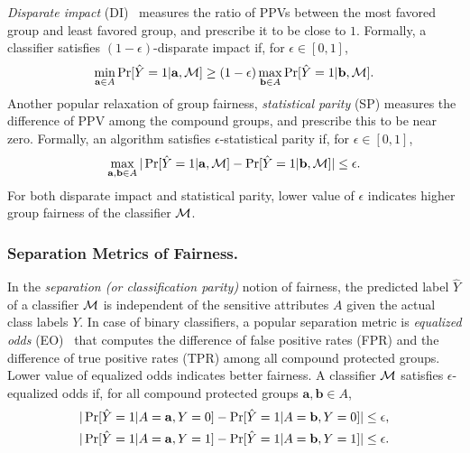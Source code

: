 \textit{Disparate impact} (DI)~\cite{feldman2015certifying} measures the ratio of PPVs between the most favored group and least favored group, and prescribe it to be close to $1$. Formally, a classifier satisfies $(1 - \epsilon)$-disparate impact if, for $\epsilon \in [0,1] $,
\[
	\min_{\mathbf{a} \in A} \Pr[\hat{Y} =1 | \mathbf{a}, \mathcal{M}]  \ge (1 - \epsilon) \max_{\mathbf{b} \in A} \Pr[\hat{Y} =1 | \mathbf{b}, \mathcal{M}].
\]
Another popular relaxation of group fairness, \textit{statistical parity} (SP) measures the difference of PPV among the compound groups, and prescribe this to be near zero. Formally, an algorithm satisfies $\epsilon$-statistical parity if, for $\epsilon \in [0,1] $, 
\[
\max_{\mathbf{a}, \mathbf{b} \in A}|\Pr[\hat{Y} =1 | \mathbf{a}, \mathcal{M}] - \Pr [\hat{Y} = 1| \mathbf{b}, \mathcal{M}]| \le \epsilon.
\]
For both disparate impact and statistical parity, lower value of $\epsilon$ indicates higher group fairness of the classifier $\mathcal{M}$. 


\begin{comment}These two metrics of fairness has a disadvantage that a fully accurate classifier with different base rates (i.e., the proportion of actual positive prediction) in different protected groups may be considered unfair. As a result, similar individuals from different protected groups may be treated differently in order to achieve group fairness{\textemdash} such treatment is prohibited by law in some cases. 
\end{comment}

\subsubsection{Separation Metrics of Fairness.}
In the \textit{separation (or classification parity)} notion of fairness, the predicted label $\hat{Y}$ of a classifier $\mathcal{M}$ is independent of the sensitive attributes $A$ given the actual class labels $Y$. In case of binary classifiers, a popular separation metric is \textit{equalized odds} (EO)~\cite{hardt2016equality} that computes the difference of false positive rates (FPR) and the difference of true positive rates (TPR) among all compound protected groups. 
Lower value of equalized odds indicates better fairness.
A classifier $\mathcal{M}$ satisfies $\epsilon$-equalized odds if, for all compound protected groups $\mathbf{a}, \mathbf{b} \in A$,
\begin{equation}
\begin{split}
|\Pr[\hat{Y} =1 | A = \mathbf{a}, Y= 0  ] - \Pr [\hat{Y} = 1| A = \mathbf{b}, Y = 0]| &\le \epsilon, \\ 
|\Pr[\hat{Y} =1 | A = \mathbf{a}, Y= 1  ] - \Pr [\hat{Y} = 1| A = \mathbf{b}, Y = 1]| &\le \epsilon.\notag
\end{split}
\end{equation}




